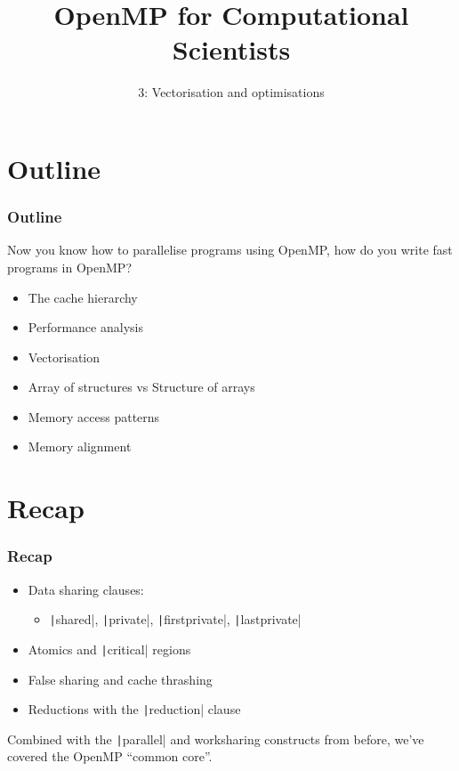 \documentclass{beamer}
\title{OpenMP for Computational Scientists}
\subtitle{3: Vectorisation and optimisations}
\begin{document}
\frame{\titlepage}

\section{Outline}
\begin{frame}
\frametitle{Outline}
Now you know how to parallelise programs using OpenMP, how do you write fast programs in OpenMP?

\begin{itemize}
  \item The cache hierarchy
  \item Performance analysis
  \item Vectorisation
  \item Array of structures vs Structure of arrays
  \item Memory access patterns
  \item Memory alignment
\end{itemize}
\end{frame}

\section{Recap}
\begin{frame}
\frametitle{Recap}

\begin{itemize}
  \item Data sharing clauses:
    \begin{itemize}
    \item \texttt|shared|, \texttt|private|, \texttt|firstprivate|, \texttt|lastprivate|
    \end{itemize}

  \item Atomics and \texttt|critical| regions

  \item False sharing and cache thrashing

  \item Reductions with the \texttt|reduction| clause
\end{itemize}

Combined with the \texttt|parallel| and worksharing constructs from before, we've covered the OpenMP ``common core''.

\end{frame}
\end{document}
